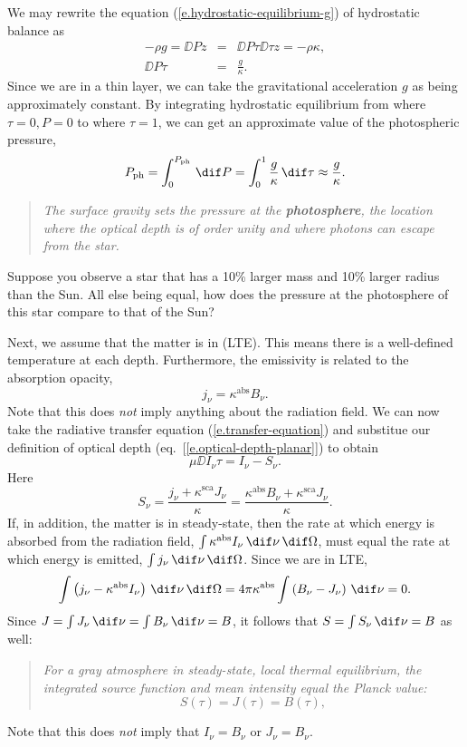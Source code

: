 We may rewrite the equation (\ref{e.hydrostatic-equilibrium-g}) of hydrostatic balance as
\begin{eqnarray}
	-\rho g = \DD{P}{z} &=& \DD{P}{\tau}\DD{\tau}{z} = -\rho\kappa,\nonumber\\
	\DD{P}{\tau} &=& \frac{g}{\kappa}.
\label{e.P-tau}
\end{eqnarray}
Since we are in a thin layer, we can take the gravitational acceleration $g$ as being approximately constant. By integrating hydrostatic equilibrium from where $\tau = 0, P = 0$ to where $\tau = 1$, we can get an approximate value of the photospheric pressure,
\[
	P_{\mathrm{ph}} = \int_{0}^{P_{\mathrm{ph}}}\,\dif P = \int_{0}^{1}\frac{g}{\kappa}\,\dif\tau \approx \frac{g}{\kappa}.
\]
\begin{quote}
\emph{The surface gravity sets the pressure at the \textbf{photosphere}, the location where the optical depth is of order unity and where photons can escape from the star.}
\end{quote}

\begin{exercisebox}
Suppose you observe a star that has a 10\% larger mass and 10\% larger radius than the Sun. All else being equal, how does the pressure at the photosphere of this star compare to that of the Sun?
\end{exercisebox}

Next, we assume that the matter is in  (LTE). This means there is a well-defined temperature at each depth. Furthermore, the emissivity is related to the absorption opacity,
\[
	j_{\nu} = \kappa^{\mathrm{abs}}B_{\nu}.
\]
Note that this does \emph{not} imply anything about the radiation field. We can now take the radiative transfer equation (\ref{e.transfer-equation}) and substitue our definition of optical depth (eq.~[\ref{e.optical-depth-planar}]) to obtain
\begin{equation}\label{e.transfer-gray}
	\mu\DD{I_{\nu}}{\tau} = I_{\nu} - S_{\nu}.
\end{equation}
Here
\[
	S_{\nu} = \frac{j_{\nu} + \kappa^{\mathrm{sca}} J_{\nu}}{\kappa}
	= \frac{\kappa^{\mathrm{abs}} B_{\nu} + \kappa^{\mathrm{sca}} J_{\nu}}{\kappa}.
\]
If, in addition, the matter is in steady-state, then the rate at which energy is absorbed from the radiation field, $\int\kappa^{\mathrm{abs}}I_{\nu}\,\dif\nu\,\dif\Omega$, must equal the rate at which energy is emitted, $\int j_{\nu}\,\dif\nu\,\dif\Omega$. Since we are in LTE,
\[
	\int \left(j_{\nu} - \kappa^{\mathrm{abs}}I_{\nu}\right)\,\dif\nu\,\dif\Omega
	= 4\pi\kappa^{\mathrm{abs}}\int\left(B_{\nu} - J_{\nu}\right)\,\dif\nu = 0.
\]
Since $J = \int J_{\nu}\,\dif\nu = \int B_{\nu}\,\dif\nu = B$, it follows that $S = \int S_{\nu}\,\dif\nu = B$ as well:
\begin{quote}
\emph{For a gray atmosphere in steady-state, local thermal equilibrium, the integrated source function and mean intensity equal the Planck value:}
\[ S(\tau) = J(\tau) = B(\tau), \]
\end{quote}
Note that this does \emph{not} imply that $I_{\nu}=B_{\nu}$ or $J_{\nu}=B_{\nu}$.

